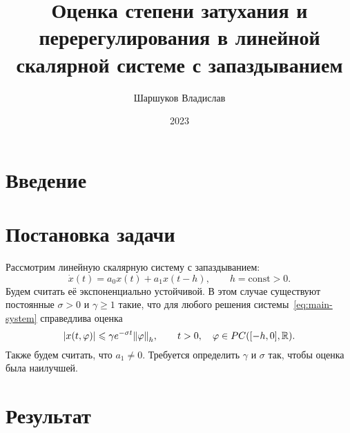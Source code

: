 \documentclass[a4paper,14pt]{article}
\title{Оценка степени затухания и перерегулирования в линейной скалярной системе с запаздыванием}
\author{Шаршуков Владислав}
\date{2023}
\begin{document}
\maketitle

\newpage

\setcounter{page}{2}

\begin{center}
  \tableofcontents
\end{center}

\newpage

\section{Введение}

\section{Постановка задачи}

Рассмотрим линейную скалярную систему с запаздыванием:
\begin{equation}
  \label{eq:main-system}
  \dot x(t) = a_0 x(t) + a_1 x(t - h), \qquad h = \mathrm{const} > 0.
\end{equation}
Будем считать её экспоненциально устойчивой. В этом случае существуют
постоянные $\sigma > 0$ и $\gamma \geqslant 1$ такие, что
для любого решения системы~\eqref{eq:main-system} справедлива
оценка
\begin{equation*}
  \abs{x(t, \varphi)} \leqslant \gamma e^{-\sigma t} \norm{\varphi}_h,
  \qquad
  t > 0,
  \quad
  \varphi \in PC([-h, 0], \mathbb{R}).
\end{equation*}
Также будем считать, что $a_1 \neq 0$. Требуется определить $\gamma$ и $\sigma$
так, чтобы оценка была наилучшей.

\section{Результат}
\end{document}
